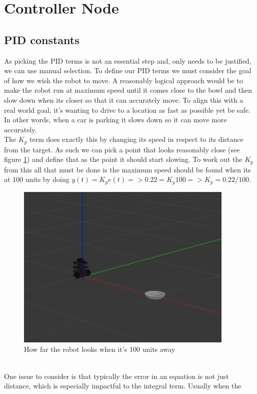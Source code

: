\documentclass{article}
\newcommand\tab[1][1cm]{\hspace*{#1}}
\begin{document}
\section{Controller Node}\label{controllerSection}
\subsection{PID constants}
As picking the PID terms is not an essential step and, only needs to be
justified, we can use manual selection. To define our PID terms we must consider
the goal of how we wish the robot to move. A reasonably logical approach would
be to make the robot run at maximum speed until it comes close to the bowl and
then slow down when its closer so that it can accurately move. To align this
with a real world goal, it's wanting to drive to a location as fast as possible
yet be safe. In other words, when a car is parking it slows down so it can move
more accurately.
\\
\tab The $K_p$ term does exactly this by changing its speed in respect to its
distance from the target. As such we can pick a point that looks reasonably
close (see figure \ref{100units}) and define that as the point it should start
slowing. To work out the $K_p$ from this all that must be done is the maximum
speed should be found when its at 100 units by doing $y(t)=K_pe(t) => 0.22 = K_p100 =>
K_p = 0.22/100$. 
\begin{figure}[ht]
    \centering
    \includegraphics[scale=0.75]{img/100_units_away.png}
    \caption{How far the robot looks when it's 100 units away}
    \label{100units}
\end{figure}
\\
\tab One issue to consider is that typically the error in an equation is not just
distance, which is especially impactful to the integral term. Usually when the
\end{document}
